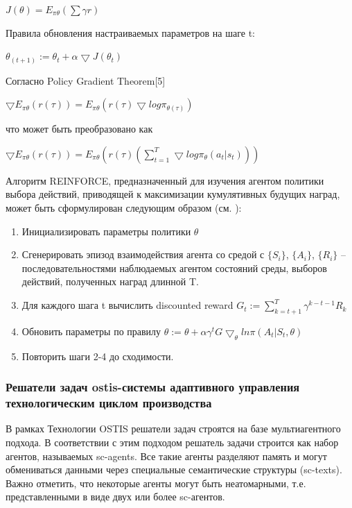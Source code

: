 $J( \theta )=E_{ \pi  \theta } ( \sum  \gamma r)$

Правила обновления настраиваемых параметров на шаге t:

$\theta _{(t+1)} := \theta _{t}+ \alpha  \bigtriangledown J( \theta _t)$


Согласно Policy Gradient Theorem[5]

$\bigtriangledown E_{ \pi  \theta } (r( \tau ) )=E_{ \pi  \theta } (r( \tau ) \bigtriangledown log \pi _{ \theta  ( \tau )})$


что может быть преобразовано как

$\bigtriangledown E_{ \pi  \theta } (r( \tau ) )=E_{ \pi  \theta } (r( \tau )( \sum_{t=1}^{T}  \bigtriangledown log  \pi _{ \theta } (a_t |s_t)))$


Алгоритм REINFORCE, предназначенный для изучения агентом политики выбора действий, приводящей к максимизации кумулятивных будущих наград, может быть сформулирован следующим образом (см. ):

\begin{enumerate}
    \item Инициализировать параметры политики $\theta$
    \item Сгенерировать эпизод взаимодействия агента со средой с $\{S_i \}$, $\{A_i \}$, $\{R_i \}$   – последовательностями наблюдаемых агентом состояний среды, выборов действий, полученных наград длинной T.
    \item Для каждого шага t вычислить discounted reward $G_t :=  \sum_{k=t+1}^{T}   \gamma ^{k-t-1} R_k  $
    \item Обновить параметры по правилу $\theta :=  \theta + \alpha  \gamma ^t G \bigtriangledown_ \theta  ln \pi (A_t |S_t, \theta )$
    \item Повторить шаги 2-4 до сходимости.


\end{enumerate}


\subsubsection{Решатели задач ostis-системы адаптивного управления технологическим циклом производства}
\label{sec_chapter_enterprise_adaptive_solvers}


В рамках Технологии OSTIS решатели задач строятся на базе мультиагентного подхода. В соответствии с этим подходом решатель задачи строится как набор агентов, называемых sc-agents. Все такие агенты разделяют память и могут обмениваться данными через специальные семантические структуры (sc-texts). Важно отметить, что некоторые агенты могут быть неатомарными, т.е. представленными в виде двух или более sc-агентов.

